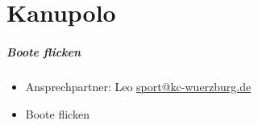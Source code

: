 \documentclass[12pt, a4paper]{report}
\begin{document}
\chapter*{Kanupolo}
\thispagestyle{Kanupolo}
\pagestyle{Kanupolo}
\paragraph{Boote flicken}
\begin{itemize}
    \item Ansprechpartner: Leo \href{mailto:sport@kc-wuerzburg.de}{sport@kc-wuerzburg.de}
    \item Boote flicken
\end{itemize}
\end{document}
